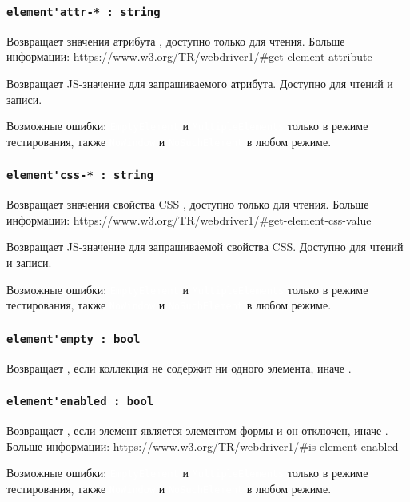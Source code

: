 \documentclass[a4paper, 14pt]{extarticle}
\newcommand{\ferror}[1]{{\fontsize{11pt}{12pt} \tt \colorbox{function}{\textcolor{white}{#1}}}}
\begin{document}
\subsubsection{\lstinline|element'attr-* : string|}

\code{[w3c]} Возвращает значения атрибута \code{*}, доступно только для чтения. Больше информации: https://www.w3.org/TR/webdriver1/\#get-element-attribute

\code{[icL]} Возвращает JS-значение для запрашиваемого атрибута. Доступно для чтений и записи.

Возможные ошибки: \ferror{EmptyElement} и \ferror{MultipleElements} только в режиме тестирования, также \ferror{NoWindow} и \ferror{NoSuchElement} в любом режиме.

\subsubsection{\lstinline|element'css-* : string|}

\code{[w3c]} Возвращает значения свойства CSS \code{*}, доступно только для чтения. Больше информации: https://www.w3.org/TR/webdriver1/\#get-element-css-value

\code{[icL]} Возвращает JS-значение для запрашиваемой свойства CSS. Доступно для чтений и записи.

Возможные ошибки: \ferror{EmptyElement} и \ferror{MultipleElements} только в режиме тестирования, также \ferror{NoWindow} и \ferror{NoSuchElement} в любом режиме.

\subsubsection{\lstinline|element'empty : bool|}

Возвращает \true, если коллекция не содержит ни одного элемента, иначе \false.

\subsubsection{\lstinline|element'enabled : bool|}

Возвращает \false, если элемент является элементом формы и он отключен, иначе \true. Больше информации: https://www.w3.org/TR/webdriver1/\#is\--element\--enabled

Возможные ошибки: \ferror{EmptyElement} и \ferror{MultipleElements} только в режиме тестирования, также \ferror{NoWindow} и \ferror{NoSuchElement} в любом режиме.
\end{document}
